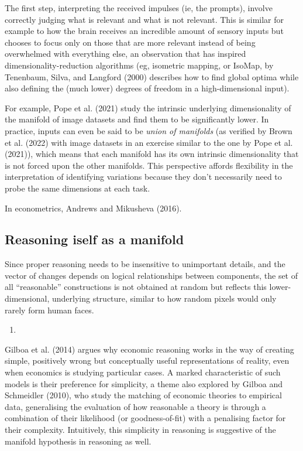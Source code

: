 \documentclass[
]{article}
\providecommand{\tightlist}{%
  \setlength{\itemsep}{0pt}\setlength{\parskip}{0pt}}\usepackage{longtable,booktabs,array}
\begin{document}
The first step, interpreting the received impulses (ie, the prompts),
involve correctly judging what is relevant and what is not relevant.
This is similar for example to how the brain receives an incredible
amount of sensory inputs but chooses to focus only on those that are
more relevant instead of being overwhelmed with everything else, an
observation that has inspired dimensionality-reduction algorithms (eg,
isometric mapping, or IsoMap, by Tenenbaum, Silva, and Langford (2000)
describes how to find global optima while also defining the (much lower)
degrees of freedom in a high-dimensional input).

For example, Pope et al. (2021) study the intrinsic underlying
dimensionality of the manifold of image datasets and find them to be
significantly lower. In practice, inputs can even be said to be
\emph{union of manifolds} (as verified by Brown et al. (2022) with image
datasets in an exercise similar to the one by Pope et al. (2021)), which
means that each manifold has its own intrinsic dimensionality that is
not forced upon the other manifolds. This perspective affords
flexibility in the interpretation of identifying variations because they
don't necessarily need to probe the same dimensions at each task.

In econometrics, Andrews and Mikusheva (2016).

\subsection{Reasoning iself as a
manifold}\label{reasoning-iself-as-a-manifold}

Since proper reasoning needs to be insensitive to unimportant details,
and the vector of changes depends on logical relationships between
components, the set of all ``reasonable'' constructions is not obtained
at random but reflects this lower-dimensional, underlying structure,
similar to how random pixels would only rarely form human faces.

\begin{enumerate}
\def\labelenumi{\arabic{enumi}.}
\tightlist
\item
\end{enumerate}

Gilboa et al. (2014) argues why economic reasoning works in the way of
creating simple, positively wrong but conceptually useful
representations of reality, even when economics is studying particular
cases. A marked characteristic of such models is their preference for
simplicity, a theme also explored by Gilboa and Schmeidler (2010), who
study the matching of economic theories to empirical data, generalising
the evaluation of how reasonable a theory is through a combination of
their likelihood (or goodness-of-fit) with a penalising factor for their
complexity. Intuitively, this simplicity in reasoning is suggestive of
the manifold hypothesis in reasoning as well.
\end{document}
